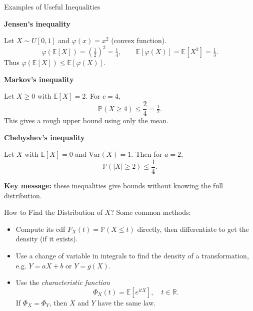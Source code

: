 \documentclass[aspectratio=169]{beamer}
\begin{document}
\begin{frame}{Examples of Useful Inequalities}

\textbf{Jensen's inequality}

Let \(X\sim U[0,1]\) and \(\varphi(x)=x^2\) (convex function).
\[
\varphi(\mathbb{E}[X]) = \left(\tfrac12\right)^2 = \tfrac14,
\qquad
\mathbb{E}[\varphi(X)] = \mathbb{E}[X^2] = \tfrac13.
\]
Thus $
\varphi(\mathbb{E}[X]) \le \mathbb{E}[\varphi(X)].
$

\medskip

\textbf{Markov's inequality}

Let \(X\ge0\) with \(\mathbb{E}[X]=2\). For \(c=4\),
\[
\mathbb{P}(X\ge4) \le \frac{2}{4}=\tfrac12.
\]
This gives a rough upper bound using only the mean.

\medskip

\textbf{Chebyshev's inequality}

Let \(X\) with \(\mathbb{E}[X]=0\) and \(\mathrm{Var}(X)=1\).
Then for \(a=2\),
\[
\mathbb{P}(|X|\ge2) \le \frac{1}{4}.
\]

\medskip

\textbf{Key message:}
these inequalities give bounds without knowing the full distribution.

\end{frame}

\begin{frame}{How to Find the Distribution of \(X\)?}
Some common methods:\pause
\begin{itemize}
  \item Compute its cdf \(F_X(t) = \mathbb{P}(X\le t)\) directly, then differentiate to get the density (if it exists).\pause
  \item Use a change of variable in integrals to find the density of a transformation, e.g. \(Y=aX+b\) or \(Y=g(X)\).\pause
  \item Use the \emph{characteristic function}
  \[
    \Phi_X(t) = \mathbb{E}[e^{itX}],\quad t\in\mathbb{R}.
  \]\pause
  If \(\Phi_X = \Phi_Y\), then \(X\) and \(Y\) have the same law.
\end{itemize}
\end{frame}
\end{document}
